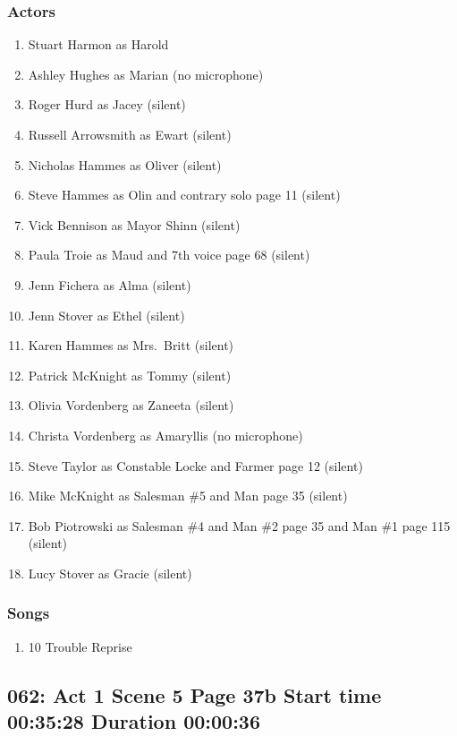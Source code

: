 \subsubsection{Actors}
\begin{enumerate}
\item Stuart Harmon as Harold
\item Ashley Hughes as Marian (no microphone)
\item Roger Hurd as Jacey (silent)
\item Russell Arrowsmith as Ewart (silent)
\item Nicholas Hammes as Oliver (silent)
\item Steve Hammes as Olin and contrary solo page 11 (silent)
\item Vick Bennison as Mayor Shinn (silent)
\item Paula Troie as Maud and 7th voice page 68 (silent)
\item Jenn Fichera as Alma (silent)
\item Jenn Stover as Ethel (silent)
\item Karen Hammes as Mrs.~Britt (silent)
\item Patrick McKnight as Tommy (silent)
\item Olivia Vordenberg as Zaneeta (silent)
\item Christa Vordenberg as Amaryllis (no microphone)
\item Steve Taylor as Constable Locke and Farmer page 12 (silent)
\item Mike McKnight as Salesman \#5 and Man page 35 (silent)
\item Bob Piotrowski as Salesman \#4 and Man \#2 page 35 and Man \#1 page 115 (silent)
\item Lucy Stover as Gracie (silent)
\end{enumerate}

\subsubsection{Songs}
\begin{enumerate}
\item 10 Trouble Reprise
\end{enumerate}
\subsection{062: Act 1 Scene 5 Page 37b Start time 00:35:28 Duration 00:00:36}


